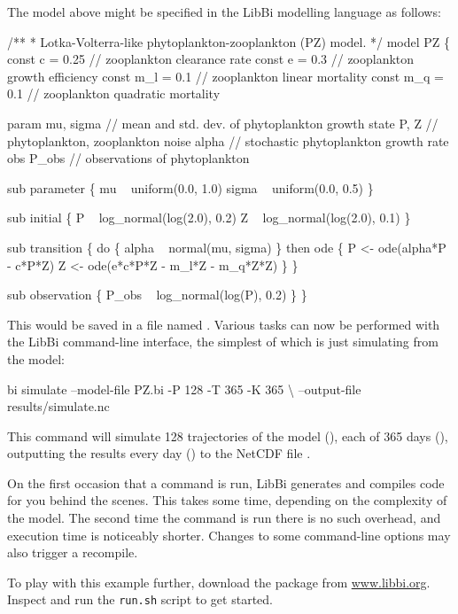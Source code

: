 The model above might be specified in the LibBi modelling language as follows:
\begin{bicode}
/**
 * Lotka-Volterra-like phytoplankton-zooplankton (PZ) model.
 */
model PZ \{
  const c = 0.25   // zooplankton clearance rate
  const e = 0.3    // zooplankton growth efficiency
  const m_l = 0.1  // zooplankton linear mortality
  const m_q = 0.1  // zooplankton quadratic mortality

  param mu, sigma  // mean and std. dev. of phytoplankton growth
  state P, Z       // phytoplankton, zooplankton
  noise alpha      // stochastic phytoplankton growth rate
  obs P_obs        // observations of phytoplankton
  
  sub parameter \{
    mu ~ uniform(0.0, 1.0)
    sigma ~ uniform(0.0, 0.5)
  \}
  
  sub initial \{
    P ~ log_normal(log(2.0), 0.2)
    Z ~ log_normal(log(2.0), 0.1)
  \}

  sub transition \{
    do \{
      alpha ~ normal(mu, sigma)
    \} then ode \{
      P <- ode(alpha*P - c*P*Z)
      Z <- ode(e*c*P*Z - m_l*Z - m_q*Z*Z)
    \}
  \}

  sub observation \{
    P_obs ~ log_normal(log(P), 0.2)
  \}
\}
\end{bicode}

This would be saved in a file named . Various tasks can now be
performed with the LibBi command-line interface, the simplest of which is
just simulating from the model:
\begin{cmdcode}
bi simulate --model-file PZ.bi -P 128 -T 365 -K 365 \textbackslash
    --output-file results/simulate.nc
\end{cmdcode}
This command will simulate 128 trajectories of the model (), each
of 365 days (), outputting the results every day ()
to the NetCDF file .

\begin{tip}
On the first occasion that a command is run, LibBi generates and compiles code
for you behind the scenes. This takes some time, depending on the complexity
of the model. The second time the command is run there is no such overhead,
and execution time is noticeably shorter. Changes to some command-line options
may also trigger a recompile.
\end{tip}

To play with this example further, download the  package from
\url{www.libbi.org}. Inspect and run the \texttt{run.sh} script to get
started.

